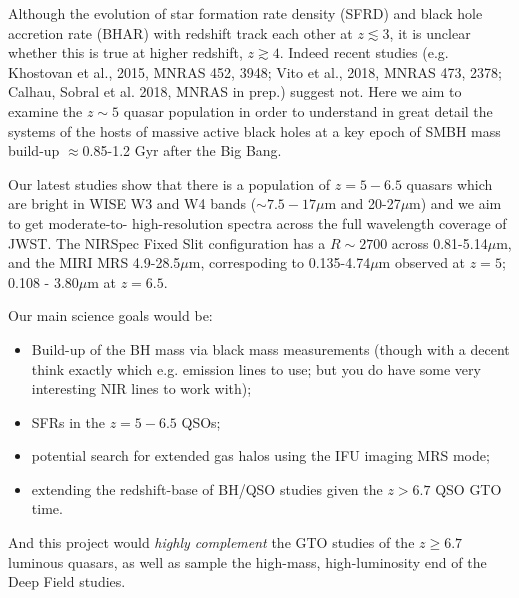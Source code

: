 Although the evolution of star formation rate density (SFRD) and black
hole accretion rate (BHAR) with redshift track each other at
$z\lesssim3$, it is unclear whether this is true at higher redshift,
$z\gtrsim4$. Indeed recent studies (e.g. Khostovan et al., 2015, MNRAS
452, 3948; Vito et al., 2018, MNRAS 473, 2378; Calhau, Sobral et
al. 2018, MNRAS in prep.)  suggest not. Here we aim to examine the
$z\sim5$ quasar population in order to understand in great detail the
systems of the hosts of massive active black holes at a key epoch of
SMBH mass build-up $\approx$0.85-1.2 Gyr after the Big Bang.

\smallskip
\smallskip
\noindent
Our latest studies show that there is a population of 
$z=5-6.5$ quasars which are  bright in WISE W3 and W4 bands ($\sim 7.5 - 17\mu$m 
and 20-27$\mu$m) and we aim to get moderate-to- high-resolution spectra across the full 
wavelength coverage of JWST. The NIRSpec Fixed Slit configuration has a 
$R\sim2700$ across 0.81-5.14$\mu$m, and the MIRI MRS 4.9-28.5$\mu$m, 
correspoding to 0.135-4.74$\mu$m observed at $z=5$; 0.108 - 3.80$\mu$m at $z=6.5$. 

\smallskip
\smallskip
\noindent
Our main science goals would be:
\begin{itemize}
\item Build-up of the BH mass via black mass measurements (though with a decent think exactly 
       which e.g. emission lines to use; but you do have some very interesting NIR lines to work with); 
\item SFRs in the $z=5-6.5$ QSOs;
\item potential search for extended gas halos using the IFU imaging MRS mode; 
\item extending the redshift-base of BH/QSO studies given the $z>6.7$ QSO GTO time. 
\end{itemize}



\smallskip
\smallskip
\noindent
And this project would {\it highly complement} the GTO studies of the $z\geq6.7$ luminous 
quasars, as well as sample the high-mass, high-luminosity end of the Deep Field studies. 



